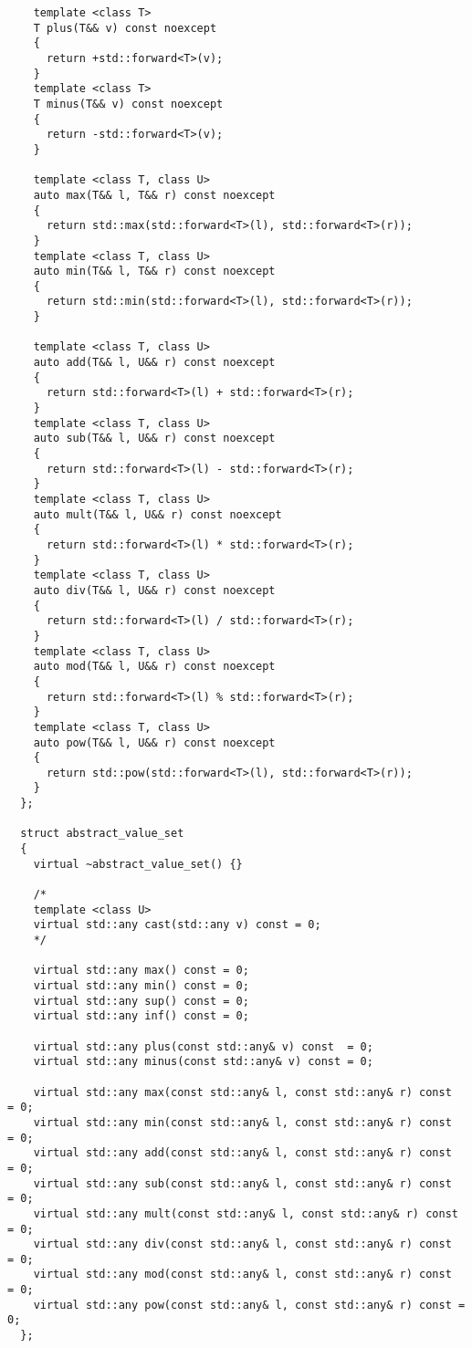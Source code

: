 \begin{verbatim}
    template <class T>
    T plus(T&& v) const noexcept
    {
      return +std::forward<T>(v);
    }
    template <class T>
    T minus(T&& v) const noexcept
    {
      return -std::forward<T>(v);
    }

    template <class T, class U>
    auto max(T&& l, T&& r) const noexcept
    {
      return std::max(std::forward<T>(l), std::forward<T>(r));
    }
    template <class T, class U>
    auto min(T&& l, T&& r) const noexcept
    {
      return std::min(std::forward<T>(l), std::forward<T>(r));
    }

    template <class T, class U>
    auto add(T&& l, U&& r) const noexcept
    {
      return std::forward<T>(l) + std::forward<T>(r);
    }
    template <class T, class U>
    auto sub(T&& l, U&& r) const noexcept
    {
      return std::forward<T>(l) - std::forward<T>(r);
    }
    template <class T, class U>
    auto mult(T&& l, U&& r) const noexcept
    {
      return std::forward<T>(l) * std::forward<T>(r);
    }
    template <class T, class U>
    auto div(T&& l, U&& r) const noexcept
    {
      return std::forward<T>(l) / std::forward<T>(r);
    }
    template <class T, class U>
    auto mod(T&& l, U&& r) const noexcept
    {
      return std::forward<T>(l) % std::forward<T>(r);
    }
    template <class T, class U>
    auto pow(T&& l, U&& r) const noexcept
    {
      return std::pow(std::forward<T>(l), std::forward<T>(r));
    }
  };

  struct abstract_value_set
  {
    virtual ~abstract_value_set() {}

    /*
    template <class U>
    virtual std::any cast(std::any v) const = 0;
    */

    virtual std::any max() const = 0;
    virtual std::any min() const = 0;
    virtual std::any sup() const = 0;
    virtual std::any inf() const = 0;

    virtual std::any plus(const std::any& v) const  = 0;
    virtual std::any minus(const std::any& v) const = 0;

    virtual std::any max(const std::any& l, const std::any& r) const  = 0;
    virtual std::any min(const std::any& l, const std::any& r) const  = 0;
    virtual std::any add(const std::any& l, const std::any& r) const  = 0;
    virtual std::any sub(const std::any& l, const std::any& r) const  = 0;
    virtual std::any mult(const std::any& l, const std::any& r) const = 0;
    virtual std::any div(const std::any& l, const std::any& r) const  = 0;
    virtual std::any mod(const std::any& l, const std::any& r) const  = 0;
    virtual std::any pow(const std::any& l, const std::any& r) const = 0;
  };


\end{verbatim}
